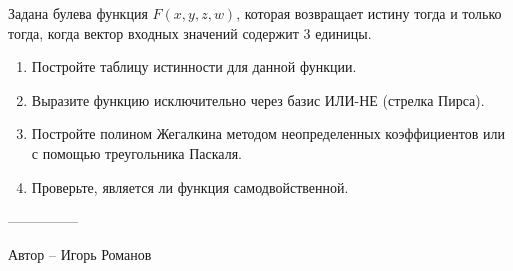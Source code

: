 \question
Задана булева функция $F(x,y,z,w)$, которая возвращает истину тогда и только тогда, когда вектор входных значений содержит 3 единицы.
\begin{enumerate}
\item Постройте таблицу истинности для данной функции.
\item Выразите функцию исключительно через базис ИЛИ-НЕ (стрелка Пирса).
\item Постройте полином Жегалкина методом неопределенных коэффициентов или с помощью треугольника Паскаля.
\item Проверьте, является ли функция самодвойственной.
\end{enumerate}

---------------

Автор -- Игорь Романов
